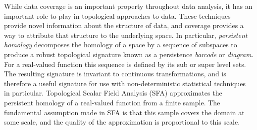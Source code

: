 While data coverage is an important property throughout data analysis, it has an important role to play in topological approaches to data.
These techniques provide novel information about the structure of data, and coverage provides a way to attribute that structure to the underlying space.
In particular, \emph{persistent homology} decomposes the homology of a space by a sequence of subspaces to produce a robust topological signature known as a persistence \emph{barcode} or \emph{diagram}.
For a real-valued function this sequence is defined by its sub or super level sets.
The resulting signature is invariant to continuous transformations, and is therefore a useful signature for use with non-deterministic statistical techniques in particular.
Topological Scalar Field Analysis (SFA) approximates the persistent homology of a real-valued function from a finite sample.
The fundamental assumption made in SFA is that this sample covers the domain at some scale, and the quality of the approximation is proportional to this scale.

